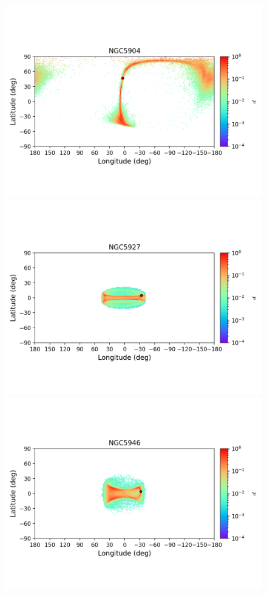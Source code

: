         \begin{figure}
        \includegraphics[clip=true, trim = 0mm 20mm 0mm 10mm, width=1\columnwidth]{images/error_plots_NGC5904.png}
        \includegraphics[clip=true, trim = 0mm 20mm 0mm 10mm, width=1\columnwidth]{images/error_plots_NGC5927.png}
        \includegraphics[clip=true, trim = 0mm 20mm 0mm 10mm, width=1\columnwidth]{images/error_plots_NGC5946.png}

\end{figure}

